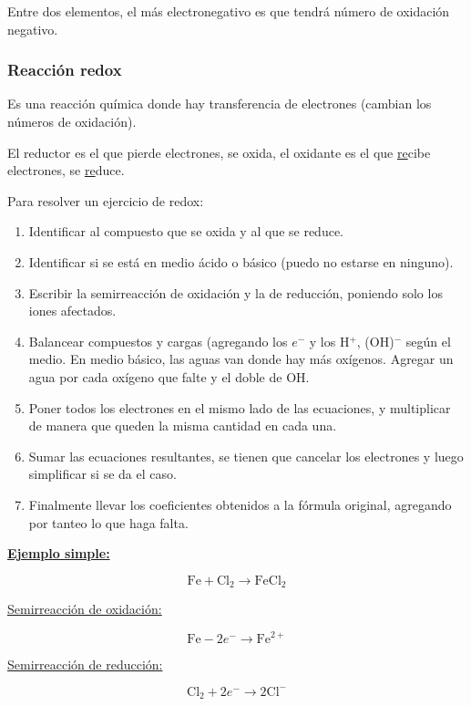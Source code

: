 Entre dos elementos, el más electronegativo es que tendrá número de oxidación negativo.

\subsubsection*{Reacción redox}

Es una reacción química donde hay transferencia de electrones (cambian los números de oxidación).

El reductor es el que pierde electrones, se oxida, el oxidante es el que \underline{re}cibe electrones, se \underline{re}duce.

Para resolver un ejercicio de redox:
\begin{enumerate}[itemsep=0pt, parsep=0.3em, topsep=0.3em]
    \item Identificar al compuesto que se oxida y al que se reduce.
    \item Identificar si se está en medio ácido o básico (puedo no estarse en ninguno).
    \item Escribir la semirreacción de oxidación y la de reducción, poniendo solo los iones afectados.
    \item Balancear compuestos y cargas (agregando los $e^-$ y los H$^+$, (OH)$^-$ según el medio. En medio básico, las aguas van donde hay más oxígenos. Agregar un agua por cada oxígeno que falte y el doble de OH.
    \item Poner todos los electrones en el mismo lado de las ecuaciones, y multiplicar de manera que queden la misma cantidad en cada una.
    \item Sumar las ecuaciones resultantes, se tienen que cancelar los electrones y luego simplificar si se da el caso.
    \item Finalmente llevar los coeficientes obtenidos a la fórmula original, agregando por tanteo lo que haga falta.
\end{enumerate}

\newpage
\textbf{\underline{Ejemplo simple:}}

$$\text{Fe} + \text{Cl}_2 \longrightarrow \text{FeCl}_2$$

\begin{multicols}{2}

\underline{Semirreacción de oxidación:}

$$\text{Fe} - 2e^- \longrightarrow \text{Fe}^{2+}$$

\underline{Semirreacción de reducción:}

$$\text{Cl}_2 + 2e^- \longrightarrow 2\text{Cl}^{-} $$

\end{multicols}

